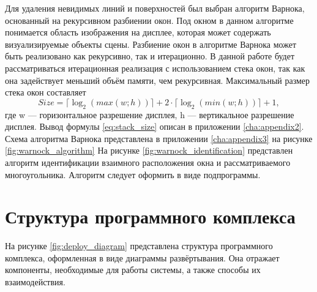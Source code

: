 Для удаления невидимых линий и поверхностей был выбран алгоритм Варнока, основанный на рекурсивном разбиении окон. Под окном в данном 
алгоритме понимается область изображения на дисплее, которая может содержать визуализируемые объекты сцены. Разбиение окон в алгоритме 
Варнока может быть реализовано как рекурсивно, так и итерационно. В данной работе будет рассматриваться итерационная реализация с 
использованием стека окон, так как она задействует меньший объём памяти, чем рекурсивная. Максимальный размер стека окон составляет
\begin{equation}
	\label{eq:stack_size}
	Size = \lceil\log_{2} (max(w; h))\rceil + 2 \cdot \lceil\log_{2} (min(w; h))\rceil + 1,
\end{equation}
где w --- горизонтальное разрешение дисплея, h --- вертикальное разрешение дисплея. Вывод формулы \ref{eq:stack_size} описан в приложении \ref{cha:appendix2}. Схема алгоритма Варнока представлена в приложении \ref{cha:appendix3} на рисунке \ref{fig:warnock_algorithm} На рисунке 
\ref{fig:warnock_identification} представлен алгоритм идентификации взаимного расположения окна и рассматриваемого многоугольника. Алгоритм 
следует оформить в виде подпрограммы.

\section{Структура программного комплекса}
На рисунке \ref{fig:deploy_diagram} представлена структура программного комплекса, оформленная в виде диаграммы развёртывания. Она отражает компоненты, необходимые для работы системы, а также способы их взаимодействия.

